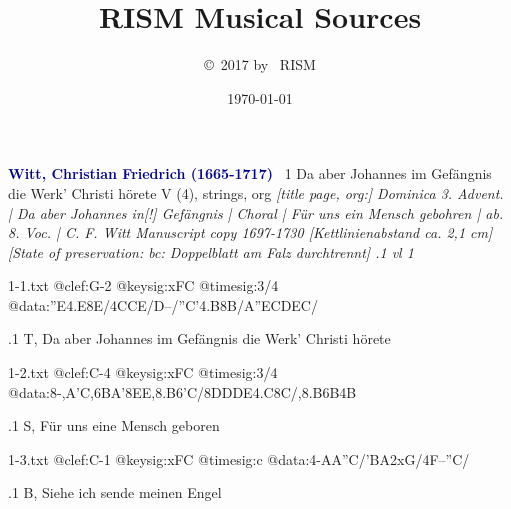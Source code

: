 \documentclass[twocolumn]{book}
\title{RISM Musical Sources}
\author{\copyright \ 2017 by \ RISM}
\date{\today}
\begin{document}
\maketitle
\thispagestyle{empty}
\cleardoublepage
\setlength{\columnseprule}{0.5pt}

\newcommand\hfillplus[1]{{\unskip\nobreak\hfill{}\
  \mbox{}\nobreak\hfill#1}}

\newline \textcolor{darkblue}{\textbf{Witt, Christian Friedrich (1665-1717)
}}\hfillplus{1}
\newline Da aber Johannes im Gefängnis die Werk' Christi hörete
\newline V (4), strings, org
\newline \itshape [title page, org:] Dominica 3. Advent. | Da aber Johannes in[!] Gefängnis | Choral | Für uns ein Mensch gebohren | ab. 8. Voc. | C. F. Witt \normalfont 
\newline \textcolor{darkblue}{\ding{182}} Manuscript copy 1697-1730 [Kettlinienabstand ca. 2,1 cm] [State of preservation: bc: Doppelblatt am Falz durchtrennt]
.1 vl 1
\newline
\begin{filecontents*}{1-1.txt}
@clef:G-2
@keysig:xFC
@timesig:3/4
@data:''E4.E8E/4CCE/D--/''C'4.B8B/{A''ECDEC}/
\end{filecontents*}
\immediate{}
%
.1 T, Da aber Johannes im Gefängnis die Werk' Christi hörete
\newline
\begin{filecontents*}{1-2.txt}
@clef:C-4
@keysig:xFC
@timesig:3/4
@data:8-,A'C,6BA'8EE,8.B6'C/8DDDE4.C8C/,8.B6B4B
\end{filecontents*}
\immediate{}
%
.1 S, Für uns eine Mensch geboren
\newline
\begin{filecontents*}{1-3.txt}
@clef:C-1
@keysig:xFC
@timesig:c
@data:4-AA''C/'BA2xG/4F--''C/
\end{filecontents*}
\immediate{}
%
.1 B, Siehe ich sende meinen Engel
\end{document}
